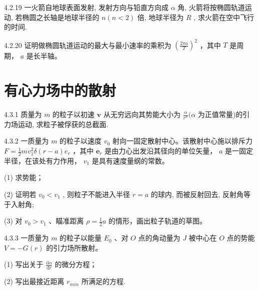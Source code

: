 \begin{problem}{4.2.19}
一火箭自地球表面发射, 发射方向与铅直方向成 $\alpha$ 角, 火箭将按椭圆轨道运动, 若椭圆之长轴是地球半径的 $n(n < 2)$ 倍, 地球半径为 $R$ , 求火箭在空中飞行的时间.
\end{problem}
\clearpage


\begin{problem}{4.2.20}
证明做椭圆轨道运动的最大与最小速率的乘积为 $\left(\frac{2\pi a}{T}\right)^2$ ，其中 $T$ 是周期， $a$ 是长半轴。
\end{problem}
\clearpage


\section{有心力场中的散射}

\begin{problem}{4.3.1}
质量为 $m$ 的粒子以初速 $\bm{v}$ 从无穷远向其势能大小为 $\frac{\alpha}{r^n} (\alpha$ 为正值常量)的引力场运动, 求粒子被俘获的总截面.
\end{problem}
\clearpage


\begin{problem}{4.3.2}
一质量为 $m$ 的粒子以速度 $v_{0}$ 射向一固定散射中心。该散射中心施以排斥力 $F = \frac{1}{2} mv_{1}^{2}\delta (r - a)e_{r}$ ，其中 $\bm{e}_{r}$ 是由力心出发沿其径向的单位矢量， $a$ 是一固定半径，在该处有力作用， $v_{1}$ 是具有速度量纲的常数。

(1) 求势能；

(2) 证明若 $v_{0} < v_{1}$ , 则粒子不能进入半径 $r = a$ 的球内, 而被反射回去, 反射角等于入射角;

(3) 对 $v_{0}>v_{1}$ 、瞄准距离 $\rho=\frac{1}{2}a$ 的情形，画出粒子轨道的草图。
\end{problem}
\clearpage


\begin{problem}{4.3.3}
一质量为 $m$ 的粒子以能量 $E_0$ 、对 $O$ 点的角动量为 $J$ 被中心在 $O$ 点的势能 $V = -G(r)$ 的引力场所散射。

(1) 写出关于 $\frac{\mathrm{d}\alpha}{\mathrm{d}r}$ 的微分方程；

(2) 写出最接近距离 $r_{min}$ 所满足的方程.
\begin{center}

\end{center}
\begin{center}

\end{center}
\end{problem}
\clearpage


